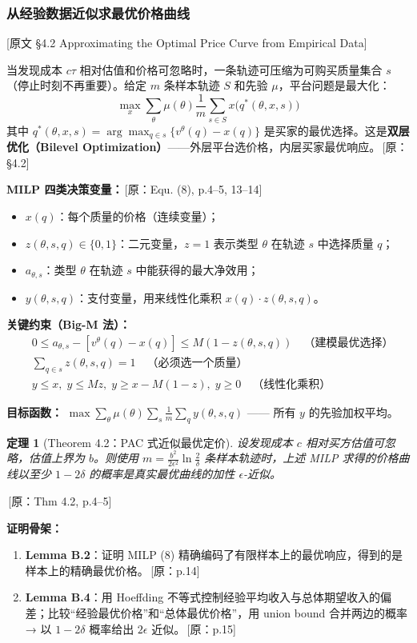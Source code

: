 \documentclass[12pt,a4paper]{article}
\newcommand{\srcref}[1]{\textcolor{black!65}{\footnotesize\,[原：#1]}}
\newcommand{\secref}[1]{\hspace{0.6em} \textcolor{black!80}{\footnotesize [原文 #1]}}
\newtheorem{theorem}{定理}[section]
\theoremstyle{definition}
\begin{document}
\subsubsection{从经验数据近似求最优价格曲线}
\secref{§4.2 Approximating the Optimal Price Curve from Empirical Data}

当发现成本 $c\tau$ 相对估值和价格可忽略时，一条轨迹可压缩为可购买质量集合 $s$（停止时刻不再重要）。给定 $m$ 条样本轨迹 $S$ 和先验 $\mu$，平台问题是最大化：
\[
\max_x \sum_\theta \mu(\theta) \frac{1}{m} \sum_{s\in S} x\big(q^*(\theta,x,s)\big)
\]
其中 $q^*(\theta,x,s) = \arg\max_{q\in s} \{v^\theta(q)-x(q)\}$ 是买家的最优选择。这是\textbf{双层优化（Bilevel Optimization）}——外层平台选价格，内层买家最优响应。\srcref{§4.2}

\textbf{MILP 四类决策变量：}\srcref{Equ. (8), p.4--5, 13--14}
\begin{itemize}[leftmargin=*]
    \item $x(q)$：每个质量的价格（连续变量）；
    \item $z(\theta,s,q) \in \{0,1\}$：二元变量，$z=1$ 表示类型 $\theta$ 在轨迹 $s$ 中选择质量 $q$；
    \item $a_{\theta,s}$：类型 $\theta$ 在轨迹 $s$ 中能获得的最大净效用；
    \item $y(\theta,s,q)$：支付变量，用来线性化乘积 $x(q)\cdot z(\theta,s,q)$。
\end{itemize}

\textbf{关键约束（Big-M 法）：}
\begin{align}
& 0 \le a_{\theta,s} - [v^\theta(q)-x(q)] \le M(1-z(\theta,s,q)) \quad\text{（建模最优选择）}\\
& \sum\nolimits_{q\in s} z(\theta,s,q) = 1 \quad\text{（必须选一个质量）}\\
& y \le x,\; y \le M z,\; y \ge x - M(1-z),\; y \ge 0 \quad\text{（线性化乘积）}
\end{align}

\textbf{目标函数：} $\max \sum_\theta \mu(\theta) \sum_s \frac{1}{m} \sum_q y(\theta,s,q)$ —— 所有 $y$ 的先验加权平均。

\begin{theorem}[Theorem 4.2：PAC 式近似最优定价]
设发现成本 $c$ 相对买方估值可忽略，估值上界为 $b$。则使用 $m = \frac{b^2}{2\epsilon^2}\ln\frac{2}{\delta}$ 条样本轨迹时，上述 MILP 求得的价格曲线以至少 $1-2\delta$ 的概率是真实最优曲线的加性 $\epsilon$-近似。
\end{theorem}
\srcref{Thm 4.2, p.4--5}

\textbf{证明骨架：}
\begin{enumerate}[leftmargin=*,nosep]
    \item \textbf{Lemma B.2}：证明 MILP (8) 精确编码了有限样本上的最优响应，得到的是样本上的精确最优价格。\srcref{p.14}
    \item \textbf{Lemma B.4}：用 Hoeffding 不等式控制经验平均收入与总体期望收入的偏差；比较``经验最优价格''和``总体最优价格''，用 union bound 合并两边的概率 → 以 $1-2\delta$ 概率给出 $2\epsilon$ 近似。\srcref{p.15}
\end{enumerate}
\end{document}
